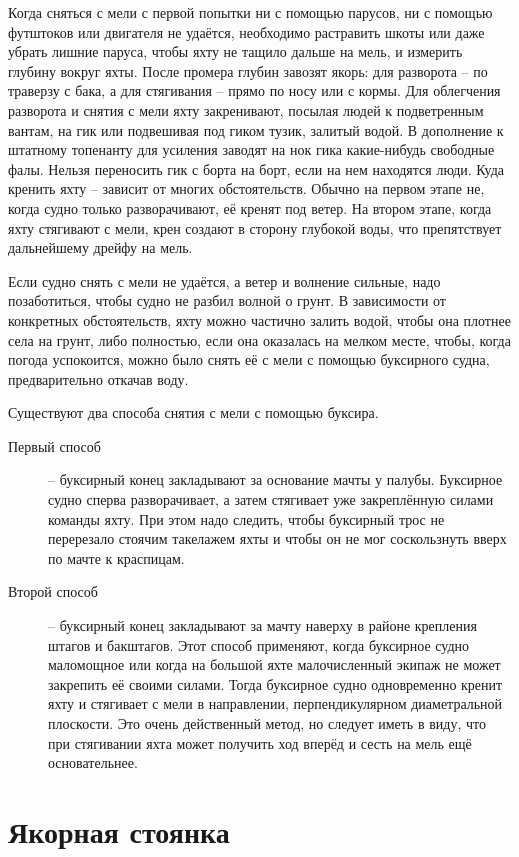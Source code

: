 Когда сняться с мели с первой попытки ни с помощью парусов, ни с
помощью футштоков или двигателя не удаётся, необходимо растравить
шкоты или даже убрать лишние паруса, чтобы яхту не тащило дальше на
мель, и измерить глубину вокруг яхты. После промера глубин завозят
якорь: для разворота \--- по траверзу с бака, а для стягивания \---
прямо по носу или с кормы. Для облегчения разворота и снятия с мели
яхту закренивают, посылая людей к подветренным вантам, на гик или
подвешивая под гиком тузик, залитый водой. В дополнение к штатному
топенанту для усиления заводят на нок гика какие-нибудь свободные
фалы. Нельзя переносить гик с борта на борт, если на нем находятся
люди. Куда кренить яхту \--- зависит от многих обстоятельств. Обычно
на первом этапе не, когда судно только разворачивают, её кренят под
ветер. На втором этапе, когда яхту стягивают с мели, крен создают в
сторону глубокой воды, что препятствует дальнейшему дрейфу на мель.

Если судно снять с мели не удаётся, а ветер и волнение сильные, надо
позаботиться, чтобы судно не разбил волной о грунт. В зависимости от
конкретных обстоятельств, яхту можно частично залить водой, чтобы она
плотнее села на грунт, либо полностью, если она оказалась на мелком
месте, чтобы, когда погода успокоится, можно было снять её с мели с
помощью буксирного судна, предварительно откачав воду.

Существуют два способа снятия с мели с помощью буксира.
\begin{description}
\item[Первый способ] \--- буксирный конец закладывают за основание
  мачты у палубы. Буксирное судно сперва разворачивает, а затем
  стягивает уже закреплённую силами команды яхту. При этом надо
  следить, чтобы буксирный трос не перерезало стоячим такелажем яхты и
  чтобы он не мог соскользнуть вверх по мачте к краспицам.
\item[Второй способ] \--- буксирный конец закладывают за мачту наверху
  в районе крепления штагов и бакштагов. Этот способ применяют, когда
  буксирное судно маломощное или когда на большой яхте малочисленный
  экипаж не может закрепить её своими силами. Тогда буксирное судно
  одновременно кренит яхту и стягивает с мели в направлении,
  перпендикулярном диаметральной плоскости. Это очень действенный
  метод, но следует иметь в виду, что при стягивании яхта может
  получить ход вперёд и сесть на мель ещё основательнее.
\end{description}

\section{Якорная стоянка}

